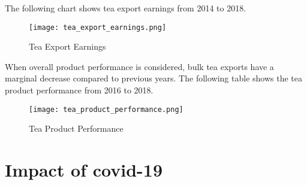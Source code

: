 \documentclass[12pt]{report}
\begin{document}
The following chart shows tea export earnings from 2014 to 2018.

\begin{figure}[H]
	\centering
	\texttt{[image: tea\_export\_earnings.png]}
	\caption{Tea Export Earnings}
\end{figure}

When overall product performance is considered, bulk tea exports have a marginal decrease compared to previous years. The following table shows the tea product performance from 2016 to 2018.

\begin{figure}[H]
	\centering
	\texttt{[image: tea\_product\_performance.png]}
	\caption{Tea Product Performance}
\end{figure}


\chapter{Impact of covid-19}
\end{document}
